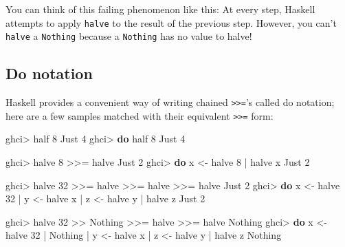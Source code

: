 \documentclass[]{article}
\newenvironment{Shaded}{}{}
\newcommand{\KeywordTok}[1]{\textcolor[rgb]{0.00,0.44,0.13}{\textbf{{#1}}}}
\newcommand{\DataTypeTok}[1]{\textcolor[rgb]{0.56,0.13,0.00}{{#1}}}
\newcommand{\DecValTok}[1]{\textcolor[rgb]{0.25,0.63,0.44}{{#1}}}
\newcommand{\OtherTok}[1]{\textcolor[rgb]{0.00,0.44,0.13}{{#1}}}
\newcommand{\FunctionTok}[1]{\textcolor[rgb]{0.02,0.16,0.49}{{#1}}}
\newcommand{\NormalTok}[1]{{#1}}
\begin{document}
You can think of this failing phenomenon like this: At every step,
Haskell attempts to apply \texttt{halve} to the result of the previous
step. However, you can't \texttt{halve} a \texttt{Nothing} because a
\texttt{Nothing} has no value to halve!

\subsection{Do notation}\label{do-notation}

Haskell provides a convenient way of writing chained
\texttt{\textgreater{}\textgreater{}=}'s called do notation; here are a
few samples matched with their equivalent
\texttt{\textgreater{}\textgreater{}=} form:

\begin{Shaded}
\begin{Highlighting}[]
\NormalTok{ghci}\FunctionTok{>} \NormalTok{half }\DecValTok{8}
\DataTypeTok{Just} \DecValTok{4}
\NormalTok{ghci}\FunctionTok{>} \KeywordTok{do}  \NormalTok{half }\DecValTok{8}
\DataTypeTok{Just} \DecValTok{4}

\NormalTok{ghci}\FunctionTok{>} \NormalTok{halve }\DecValTok{8} \FunctionTok{>>=} \NormalTok{halve}
\DataTypeTok{Just} \DecValTok{2}
\NormalTok{ghci}\FunctionTok{>} \KeywordTok{do}  \NormalTok{x }\OtherTok{<-} \NormalTok{halve }\DecValTok{8}
    \FunctionTok{|}     \NormalTok{halve x}
\DataTypeTok{Just} \DecValTok{2}

\NormalTok{ghci}\FunctionTok{>} \NormalTok{halve }\DecValTok{32} \FunctionTok{>>=} \NormalTok{halve }\FunctionTok{>>=} \NormalTok{halve }\FunctionTok{>>=} \NormalTok{halve}
\DataTypeTok{Just} \DecValTok{2}
\NormalTok{ghci}\FunctionTok{>} \KeywordTok{do}  \NormalTok{x }\OtherTok{<-} \NormalTok{halve }\DecValTok{32}
    \FunctionTok{|}     \NormalTok{y }\OtherTok{<-} \NormalTok{halve x}
    \FunctionTok{|}     \NormalTok{z }\OtherTok{<-} \NormalTok{halve y}
    \FunctionTok{|}     \NormalTok{halve z}
\DataTypeTok{Just} \DecValTok{2}

\NormalTok{ghci}\FunctionTok{>} \NormalTok{halve }\DecValTok{32} \FunctionTok{>>} \DataTypeTok{Nothing} \FunctionTok{>>=} \NormalTok{halve }\FunctionTok{>>=} \NormalTok{halve}
\DataTypeTok{Nothing}
\NormalTok{ghci}\FunctionTok{>} \KeywordTok{do}  \NormalTok{x }\OtherTok{<-} \NormalTok{halve }\DecValTok{32}
    \FunctionTok{|}     \DataTypeTok{Nothing}
    \FunctionTok{|}     \NormalTok{y }\OtherTok{<-} \NormalTok{halve x}
    \FunctionTok{|}     \NormalTok{z }\OtherTok{<-} \NormalTok{halve y}
    \FunctionTok{|}     \NormalTok{halve z}
\DataTypeTok{Nothing}
\end{Highlighting}
\end{Shaded}
\end{document}
